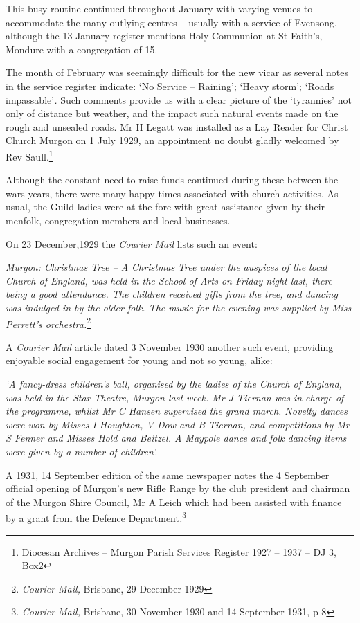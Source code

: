 This busy routine continued throughout January with varying venues to accommodate the many outlying centres -- usually with a service of Evensong, although the 13 January register mentions Holy Communion at St Faith's, Mondure with a congregation of 15.

The month of February was seemingly difficult for the new vicar as several notes in the service register indicate: `No Service -- Raining'; `Heavy storm'; `Roads impassable'\emph{.} Such comments provide us with a clear picture of the `tyrannies' not only of distance but weather, and the impact such natural events made on the rough and unsealed roads. Mr H Legatt was installed as a Lay Reader for Christ Church Murgon on 1 July 1929, an appointment no doubt gladly welcomed by Rev Saull.\footnote{Diocesan Archives -- Murgon Parish Services Register 1927 -- 1937 -- DJ 3, Box2}

Although the constant need to raise funds continued during these between-the-wars years, there were many happy times associated with church activities. As usual, the Guild ladies were at the fore with great assistance given by their menfolk, congregation members and local businesses.

On 23 December,1929 the \emph{Courier Mail} lists such an event:

\emph{Murgon: Christmas Tree -- A Christmas Tree under the auspices of the local Church of England, was held in the School of Arts on Friday night last, there being a good attendance. The children received gifts from the tree, and dancing was indulged in by the older folk. The music for the evening was supplied by Miss Perrett's orchestra.}\footnote{\emph{Courier Mail,} Brisbane, 29 December 1929}

A \emph{Courier Mail} article dated 3 November 1930 another such event, providing enjoyable social engagement for young and not so young, alike:

\emph{`A fancy-dress children's ball, organised by the ladies of the Church of England, was held in the Star Theatre, Murgon last week. Mr J Tiernan was in charge of the programme, whilst Mr C Hansen supervised the grand march. Novelty dances were won by Misses I Houghton, V Dow and B Tiernan, and competitions by Mr S Fenner and Misses Hold and Beitzel. A Maypole dance and folk dancing items were given by a number of children'.}

A 1931, 14 September edition of the same newspaper notes the 4 September official opening of Murgon's new Rifle Range by the club president and chairman of the Murgon Shire Council, Mr A Leich which had been assisted with finance by a grant from the Defence Department\emph{.}\footnote{\emph{Courier Mail,} Brisbane, 30 November 1930 and 14 September 1931, p 8}

